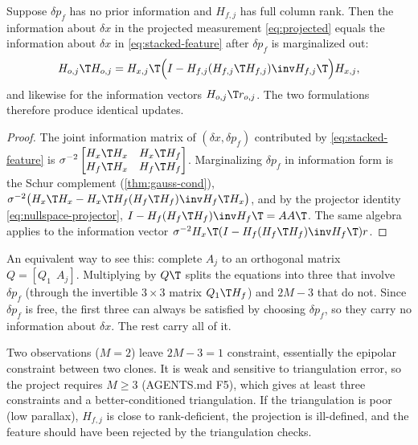 \begin{theorem}
\label{thm:nullspace-optimal}
Suppose $\delta p_f$ has no prior information and $H_{f,j}$ has full column rank. Then the information about $\delta x$ in the
projected measurement \eqref{eq:projected} equals the information about $\delta x$ in \eqref{eq:stacked-feature} after $\delta p_f$ is marginalized
out:
\begin{equation}
  H_{o,j}\T H_{o,j} = H_{x,j}\T\Big(I - H_{f,j}(H_{f,j}\T H_{f,j})\inv H_{f,j}\T\Big)H_{x,j},
\end{equation}
and likewise for the information vectors $H_{o,j}\T r_{o,j}$. The two formulations therefore produce identical updates.
\end{theorem}
\begin{proof}
The joint information matrix of $(\delta x, \delta p_f)$ contributed by \eqref{eq:stacked-feature} is
$\sigma^{-2}\begin{bmatrix} H_x\T H_x & H_x\T H_f \\ H_f\T H_x & H_f\T H_f\end{bmatrix}$. Marginalizing $\delta p_f$ in information form is the Schur
complement (\cref{thm:gauss-cond}), $\sigma^{-2}\big(H_x\T H_x - H_x\T H_f(H_f\T H_f)\inv H_f\T H_x\big)$, and by the projector identity
\eqref{eq:nullspace-projector}, $I - H_f(H_f\T H_f)\inv H_f\T = A A\T$. The same algebra applies to the information vector
$\sigma^{-2}H_x\T(I - H_f(H_f\T H_f)\inv H_f\T)r$.
\end{proof}

An equivalent way to see this: complete $A_j$ to an orthogonal matrix $Q = [Q_1\ \ A_j]$. Multiplying by $Q\T$ splits the equations
into three that involve $\delta p_f$ (through the invertible $3\times3$ matrix $Q_1\T H_f$) and $2M - 3$ that do not. Since $\delta p_f$ is free,
the first three can always be satisfied by choosing $\delta p_f$, so they carry no information about $\delta x$. The rest carry all
of it.

\begin{remark}
Two observations ($M = 2$) leave $2M - 3 = 1$ constraint, essentially the epipolar constraint between two clones. It is weak and
sensitive to triangulation error, so the project requires $M \ge 3$ (AGENTS.md F5), which gives at least three constraints and
a better-conditioned triangulation. If the triangulation is poor (low parallax), $H_{f,j}$ is close to rank-deficient, the
projection is ill-defined, and the feature should have been rejected by the triangulation checks.
\end{remark}

